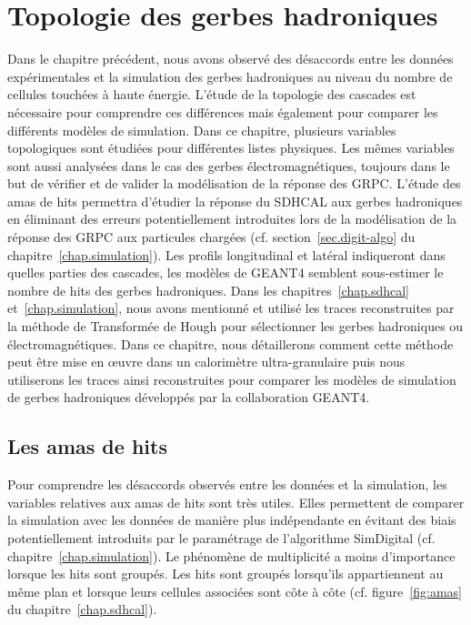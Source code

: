 \chapter{Topologie des gerbes hadroniques}
\label{chap.topo}
Dans le chapitre précédent, nous avons observé des désaccords entre les données expérimentales et la simulation des gerbes hadroniques au niveau du nombre de cellules touchées à haute énergie. L'étude de la topologie des cascades est nécessaire pour comprendre ces différences mais également pour comparer les différents modèles de simulation. Dans ce chapitre, plusieurs variables topologiques sont étudiées pour différentes listes physiques. Les mêmes variables sont aussi analysées dans le cas des gerbes électromagnétiques, toujours dans le but de vérifier et de valider la modélisation de la réponse des GRPC. L'étude des amas de hits permettra d'étudier la réponse du SDHCAL aux gerbes hadroniques en éliminant des erreurs potentiellement introduites lors de la modélisation de la réponse des GRPC aux particules chargées (cf. section~\ref{sec.digit-algo} du chapitre~\ref{chap.simulation}). Les profils longitudinal et latéral indiqueront dans quelles parties des cascades, les modèles de GEANT4 semblent sous-estimer le nombre de hits des gerbes hadroniques. Dans les chapitres~\ref{chap.sdhcal} et~\ref{chap.simulation}, nous avons mentionné et utilisé les traces reconstruites par la méthode de Transformée de Hough pour sélectionner les gerbes hadroniques ou électromagnétiques. Dans ce chapitre, nous détaillerons comment cette méthode peut être mise en œuvre dans un calorimètre ultra-granulaire puis nous utiliserons les traces ainsi reconstruites pour comparer les modèles de simulation de gerbes hadroniques développés par la collaboration GEANT4.
\minitoc
\newpage


\section{Les amas de hits}
Pour comprendre les désaccords observés entre les données et la simulation, les variables relatives aux amas de hits sont très utiles. Elles permettent de comparer la simulation avec les données de manière plus indépendante en évitant des biais potentiellement introduits par le paramétrage de l'algorithme SimDigital (cf. chapitre~\ref{chap.simulation}). Le phénomène de multiplicité a moins d'importance lorsque les hits sont groupés. Les hits sont groupés lorsqu'ils appartiennent au même plan et lorsque leurs cellules associées sont côte à côte (cf. figure~\ref{fig:amas} du chapitre~\ref{chap.sdhcal}). 

